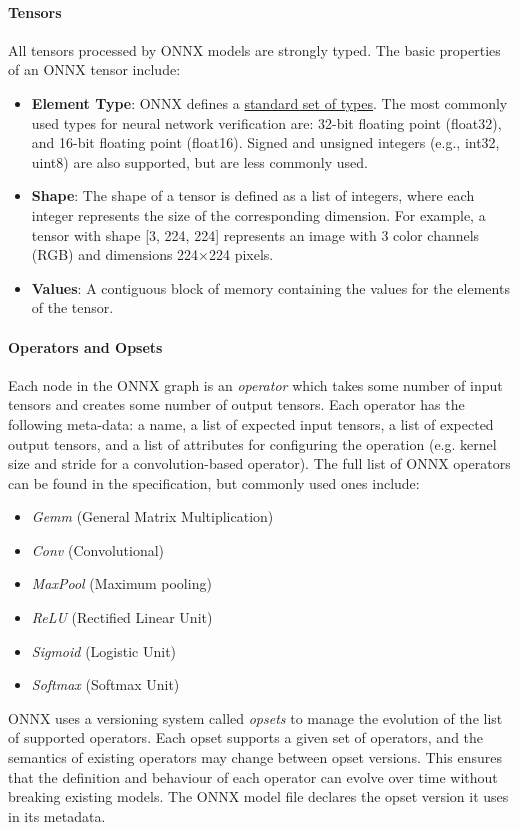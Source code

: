 \paragraph{Tensors}
All tensors processed by ONNX models are strongly typed. The basic properties of an ONNX tensor include:
\begin{itemize}
	\item \textbf{Element Type}: ONNX defines a \href{https://onnx.ai/onnx/repo-docs/IR.html#tensor-element-types}{standard set of types}. 
	The most commonly used types for neural network verification are: 32-bit floating point (float32), and 16-bit floating point (float16). Signed and unsigned integers (e.g., int32, uint8) are also supported, but are less commonly used.
	\item \textbf{Shape}: The shape of a tensor is defined as a list of integers, where each integer represents the size of the corresponding dimension. For example, a tensor with shape [3, 224, 224] 
	represents an image with 3 color channels (RGB) and dimensions 224\(\times\)224 pixels.
	\item \textbf{Values}: A contiguous block of memory containing the values for the elements of the tensor.
\end{itemize}

\paragraph{Operators and Opsets}

Each node in the ONNX graph is an \emph{operator} which takes some number of input tensors and creates some number of output tensors. Each operator has the following meta-data: a name, a list of expected input tensors, a list of expected output tensors, and a list of attributes for configuring the operation (e.g. kernel size and stride for a convolution-based operator). The full list of ONNX operators can be found in the specification, but commonly used ones include:
\begin{itemize}
\item \textit{Gemm} (General Matrix Multiplication)
\item \textit{Conv} (Convolutional)
\item \textit{MaxPool} (Maximum pooling)
\item \textit{ReLU} (Rectified Linear Unit)
\item  \textit{Sigmoid} (Logistic Unit)
\item \textit{Softmax} (Softmax Unit)
\end{itemize}
ONNX uses a versioning system called \emph{opsets} to manage the evolution of the list of supported operators. Each opset supports a given set of operators, and the semantics of existing operators may change between opset versions.
This ensures that the definition and behaviour of each operator can evolve over time without breaking existing models. The ONNX model file declares the opset version it uses in its metadata.


